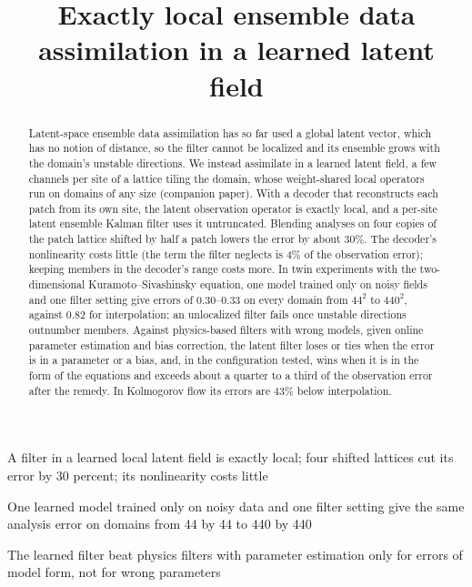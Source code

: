 \documentclass[draft]{PJ2019}
\begin{document}
\title{Exactly local ensemble data assimilation in a learned latent field}




\begin{keypoints}
\item A filter in a learned local latent field is exactly local; four shifted lattices cut its error by 30 percent; its nonlinearity costs little
\item One learned model trained only on noisy data and one filter setting give the same analysis error on domains from 44 by 44 to 440 by 440
\item The learned filter beat physics filters with parameter estimation only for errors of model form, not for wrong parameters
\end{keypoints}

\begin{abstract}
Latent-space ensemble data assimilation has so far used a global latent vector, which has no
notion of distance, so the filter cannot be localized and its ensemble grows with the domain's
unstable directions. We instead assimilate in a
learned latent field, a few channels per site of a lattice tiling the domain, whose
weight-shared local operators run on domains of any size (companion
paper). With a decoder that reconstructs each patch from its own site, the latent observation
operator is exactly local, and a per-site latent ensemble Kalman filter uses it untruncated.
Blending analyses on four copies of the patch lattice shifted by half a patch lowers the error by about $30\%$.
The decoder's nonlinearity costs little (the term the filter neglects is $4\%$ of the observation
error); keeping members in the decoder's range costs more.
In twin experiments with the
two-dimensional Kuramoto--Sivashinsky equation, one model trained only on noisy fields and one
filter setting give errors of $0.30$--$0.33$ on every domain from $44^2$ to $440^2$,
against $0.82$ for interpolation; an unlocalized filter fails once unstable directions outnumber members.
Against physics-based filters with wrong models, given online parameter estimation and bias
correction, the latent filter loses or ties when the error is in a parameter or a bias, and, in the
configuration tested, wins when it is in the form of the equations and exceeds about a quarter to a third of
the observation error after the remedy.
In Kolmogorov flow its errors are $43\%$ below interpolation.
\end{abstract}
\end{document}
